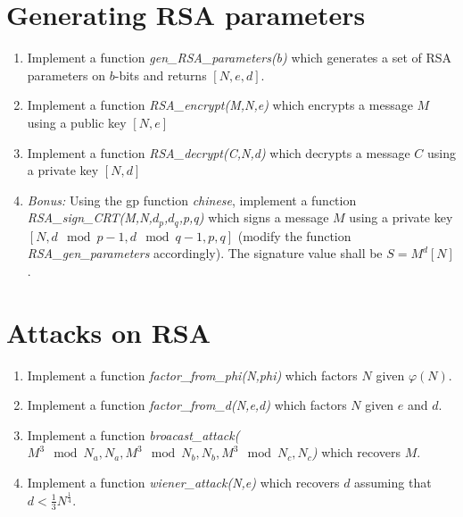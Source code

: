 \documentclass[12pt]{article}
\begin{document}
\section{Generating RSA parameters}
\begin{enumerate}
	\item Implement a function {\it gen\_RSA\_parameters(b)} which generates a set of RSA parameters on $b$-bits and returns $[N,e,d]$.
	\item Implement a function {\it RSA\_encrypt(M,N,e)} which encrypts a message $M$ using a public key $[N,e]$
	\item Implement a function {\it RSA\_decrypt(C,N,d)} which decrypts a message $C$ using a private key $[N,d]$
	\item {\it Bonus:} Using the gp function {\it chinese}, implement a function {\it RSA\_sign\_CRT(M,N,$d_p$,$d_q$,p,q)} which signs a message $M$ using a private key $[N,d \mod p-1, d \mod q-1,p,q]$ (modify the function {\it RSA\_gen\_parameters} accordingly). The signature value shall be $S=M^d [N]$.
\end{enumerate}

\section{Attacks on RSA}
\begin{enumerate}
	\item Implement a function {\it factor\_from\_phi(N,phi)} which factors $N$ given $\varphi(N)$.
	\item Implement a function {\it factor\_from\_d(N,e,d)} which factors $N$ given $e$ and $d$.
	\item Implement a function {\it broacast\_attack($M^3 \mod N_a,N_a,M^3 \mod N_b,N_b,M^3 \mod N_c,N_c$)} which recovers $M$.
	\item Implement a function {\it wiener\_attack(N,e)} which recovers $d$ assuming that $d < \frac{1}{3}N^{\frac{1}{4}}$.
\end{enumerate}
\end{document}
